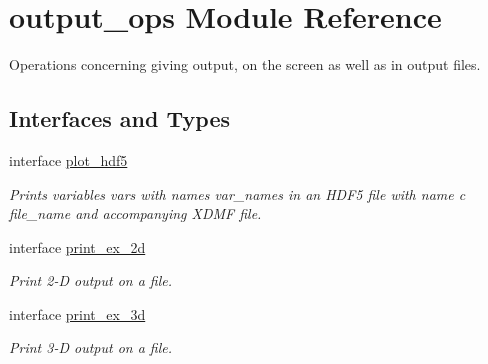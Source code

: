 \hypertarget{namespaceoutput__ops}{}\section{output\+\_\+ops Module Reference}
\label{namespaceoutput__ops}


Operations concerning giving output, on the screen as well as in output files.  


\subsection*{Interfaces and Types}
\begin{DoxyCompactItemize}
\item 
interface \hyperlink{interfaceoutput__ops_1_1plot__hdf5}{plot\+\_\+hdf5}
\begin{DoxyCompactList}\small\item\em Prints variables {\ttfamily vars} with names {\ttfamily var\+\_\+names} in an H\+D\+F5 file with name c file\+\_\+name and accompanying X\+D\+MF file. \end{DoxyCompactList}\item 
interface \hyperlink{interfaceoutput__ops_1_1print__ex__2d}{print\+\_\+ex\+\_\+2d}
\begin{DoxyCompactList}\small\item\em Print 2-\/D output on a file. \end{DoxyCompactList}\item 
interface \hyperlink{interfaceoutput__ops_1_1print__ex__3d}{print\+\_\+ex\+\_\+3d}
\begin{DoxyCompactList}\small\item\em Print 3-\/D output on a file. \end{DoxyCompactList}\end{DoxyCompactItemize}
